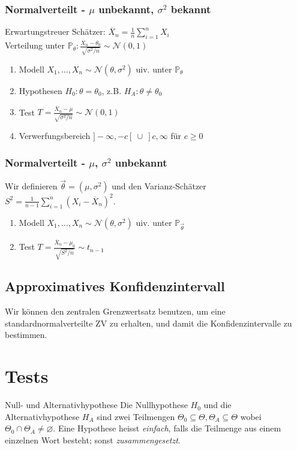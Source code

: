 \documentclass[a4paper,10pt]{article}
\def\P{\mathbb{P}}
\begin{document}
\subsubsection{\texorpdfstring{Normalverteilt - \(\mu\) unbekannt, \(\sigma^2\) bekannt}{Normalverteilt - μ unbekannt, σ² bekannt}}
Erwartungstreuer Schätzer: \(\overline{X}_n = \frac{1}{n} \sum_{i=1}^n X_i\)\\
Verteilung unter \(\P_\theta: \frac{\overline{X}_n - \theta_0}{\sqrt{\sigma^2/n}} \sim \mathcal{N}(0,1)\)
\begin{enumerate}
	\item Modell \(X_1, \ldots, X_n \sim \mathcal{N}(\theta, \sigma^2)\) uiv. unter \(\P_\theta\)
	\item Hypothesen \(H_0 : \theta = \theta_0\), z.B. \(H_A : \theta \ne \theta_0\)
	\item Test \(T = \frac{\overline{X}_n - \mu}{\sqrt{\sigma^2/n}} \sim \mathcal{N}(0,1)\)
	\item Verwerfungsbereich \(]-\infty, -c[ \ \cup \ ] c, \infty\) für \(c\ge 0\)
\end{enumerate}

\subsubsection{\texorpdfstring{Normalverteilt - \(\mu\), \(\sigma^2\) unbekannt}{Normalverteilt - μ, σ² unbekannt}}
Wir definieren \(\vec{\theta} = (\mu, \sigma^2)\) und den Varianz-Schätzer \(S^2 = \frac{1}{n-1}\sum_{i=1}^n (X_i - \overline{X}_n)^2\).
\begin{enumerate}
	\item Modell \(X_1, \ldots, X_n \sim \mathcal{N}(\theta, \sigma^2)\) uiv. unter \(\P_{\vec{\theta}}\)
	\item Test \(T = \frac{\overline{X}_n - \mu_0}{\sqrt{S^2/n}} \sim t_{n-1}\)
\end{enumerate}

\subsection{Approximatives Konfidenzintervall}
Wir können den zentralen Grenzwertsatz benutzen, um eine standardnormalverteilte ZV zu erhalten, und damit die Konfidenzintervalle zu bestimmen.

\section{Tests}
\begin{subbox}{Null- und Alternativhypothese}
	Die Nullhypothese \(H_0\) und die Alternativhypothese \(H_A\) sind zwei Teilmengen \(\Theta_0 \subseteq \Theta, \Theta_A \subseteq \Theta\) wobei \(\Theta_0 \cap \Theta_A \ne \varnothing\). Eine Hypothese heisst \textit{einfach}, falls die Teilmenge aus einem einzelnen Wort besteht; sonst \textit{zusammengesetzt}.
\end{subbox}
\end{document}
